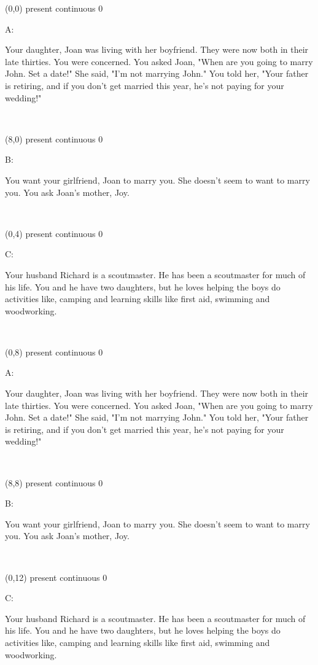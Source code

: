 \documentclass[a4paper]{article}
\newcommand{\myIdentifier}[0]{
present continuous 0
}
\newcommand{\myAcontent}[0]{
Your daughter, Joan was living with her boyfriend. They were now both in their late thirties. You were concerned. You asked Joan, "When are you going to marry John. Set a date!" She said, "I'm not marrying John." You told her, "Your father is retiring, and if you don't get married this year, he's not paying for your wedding!"
}
\newcommand{\myBcontent}[0]{
You want your girlfriend, Joan to marry you. She doesn't seem to want to marry you. You ask Joan's mother, Joy.
}
\newcommand{\myCcontent}[0]{
Your husband Richard is a scoutmaster. He has been a scoutmaster for much of his life. You and he have two daughters, but he loves helping the boys do activities like, camping and learning skills like first aid, swimming and woodworking.
}
\newcommand{\mycard}[5]{%
	\vspace{0.1cm}
	\small #1 #2
	\par
	\parbox[t][6.7cm][c]{9.5cm}{%
	\hspace{0.1cm} \Large#3\\
	\normalsize#4 #5
	}
}
\begin{document}
\selectfont

\begin{textblock}{8}(0,0)
\mycard{}{\myIdentifier}{\parbox{9.0cm}{A:
\myAcontent
}}{}{} 
\end{textblock}

\begin{textblock}{8}(8,0)
\mycard{}{\myIdentifier}{\parbox{9.0cm}{B:
\myBcontent
}}{}{} 
\end{textblock}

\begin{textblock}{8}(0,4)
\mycard{}{\myIdentifier}{\parbox{9.0cm}{C:
\myCcontent
}}{}{} 
\end{textblock}

\begin{textblock}{8}(0,8)
\mycard{}{\myIdentifier}{\parbox{9.0cm}{A:
\myAcontent
}}{}{} 
\end{textblock}

\begin{textblock}{8}(8,8)
\mycard{}{\myIdentifier}{\parbox{9.0cm}{B:
\myBcontent
}}{}{} 
\end{textblock}

\begin{textblock}{8}(0,12)
\mycard{}{\myIdentifier}{\parbox{9.0cm}{C:
\myCcontent
}}{}{} 
\end{textblock}
\end{document}
